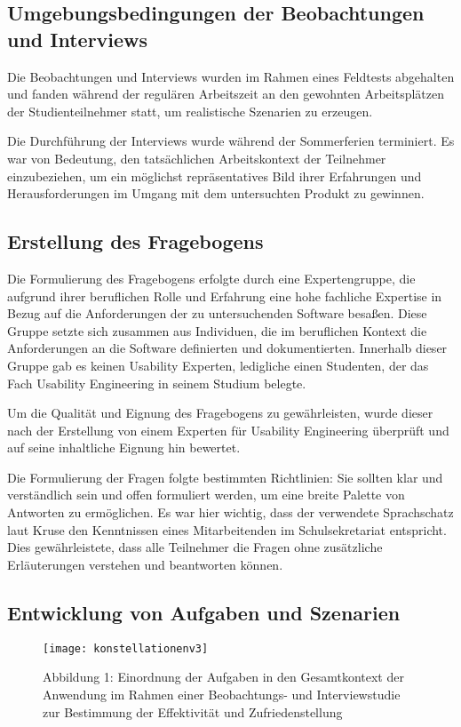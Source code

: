 \subsection{Umgebungsbedingungen der Beobachtungen und Interviews}

Die Beobachtungen und Interviews wurden im Rahmen eines Feldtests abgehalten und fanden während der regulären Arbeitszeit an den gewohnten Arbeitsplätzen der Studienteilnehmer statt, um realistische Szenarien zu erzeugen. 

Die Durchführung der Interviews wurde während der Sommerferien terminiert. Es war von Bedeutung, den tatsächlichen Arbeitskontext der Teilnehmer einzubeziehen, um ein möglichst repräsentatives Bild ihrer Erfahrungen und Herausforderungen im Umgang mit dem untersuchten Produkt zu gewinnen.

\subsection{Erstellung des Fragebogens}

Die Formulierung des Fragebogens erfolgte durch eine Expertengruppe, die aufgrund ihrer beruflichen Rolle und Erfahrung eine hohe fachliche Expertise in Bezug auf die Anforderungen der zu untersuchenden Software besaßen. Diese Gruppe setzte sich zusammen aus Individuen, die im beruflichen Kontext die Anforderungen an die Software definierten und dokumentierten. Innerhalb dieser Gruppe gab es keinen Usability Experten, ledigliche einen Studenten, der das Fach \glqq Usability Engineering\grqq{} in seinem Studium belegte.

Um die Qualität und Eignung des Fragebogens zu gewährleisten, wurde dieser nach der Erstellung von einem Experten für Usability Engineering überprüft und auf seine inhaltliche Eignung hin bewertet.

Die Formulierung der Fragen folgte bestimmten Richtlinien: Sie sollten klar und verständlich sein und offen formuliert werden, um eine breite Palette von Antworten zu ermöglichen. Es war hier wichtig, dass der verwendete Sprachschatz laut Kruse den Kenntnissen eines Mitarbeitenden im Schulsekretariat entspricht.\cite{Kruse_2015} Dies gewährleistete, dass alle Teilnehmer die Fragen ohne zusätzliche Erläuterungen verstehen und beantworten können.

\subsection{Entwicklung von Aufgaben und Szenarien}
\begin{figure}[H]
    \caption{Abbildung 1: Einordnung der Aufgaben in den Gesamtkontext der Anwendung im Rahmen einer Beobachtungs- und Interviewstudie zur Bestimmung der Effektivität und Zufriedenstellung}
    \texttt{[image: konstellationenv3]}
\end{figure}

